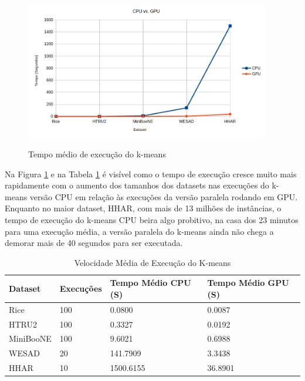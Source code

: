 \documentclass[12pt,
openright, 
oneside, %
a4paper,    %
brazil]{facom-ufu-abntex2}
\begin{document}
\begin{figure}[h]
  \caption{Tempo médio de execução do k-means}
  \centering
  \includegraphics[width=0.95\textwidth]{kMeansAvgTime.png}
  \label{fig:kMeansAvgTime}
\end{figure}

Na Figura \ref{fig:kMeansAvgTime} e na Tabela \ref{tab:avgTimeResults} é visível como o tempo de execução cresce muito mais rapidamente com o aumento dos tamanhos dos datasets nas execuções do k-means versão CPU em relação às execuções da versão paralela rodando em GPU. Enquanto no maior dataset, HHAR, com mais de 13 milhões de instâncias, o tempo de execução do k-means CPU beira algo probitivo, na casa dos 23 minutos para uma execução média, a versão paralela do k-means ainda não chega a demorar mais de 40 segundos para ser executada.

\begin{table}[]
  \centering
  \caption{Velocidade Média de Execução do K-means}
  \label{tab:avgTimeResults}
  \begin{tabular}{|l|l|l|l|}
  \hline
  \rowcolor[HTML]{9B9B9B} 
  \textbf{Dataset} & \textbf{Execuções} & \textbf{Tempo Médio CPU (S)} & \textbf{Tempo Médio GPU (S)} \\ \hline
  Rice             & 100                & 0.0800                       & 0.0087                       \\ \hline
  HTRU2            & 100                & 0.3327                       & 0.0192                       \\ \hline
  MiniBooNE        & 100                & 9.6021                       & 0.6988                       \\ \hline
  WESAD            & 20                 & 141.7909                     & 3.3438                       \\ \hline
  HHAR             & 10                 & 1500.6155                    & 36.8901                      \\ \hline
  \end{tabular}
\end{table}
\end{document}
